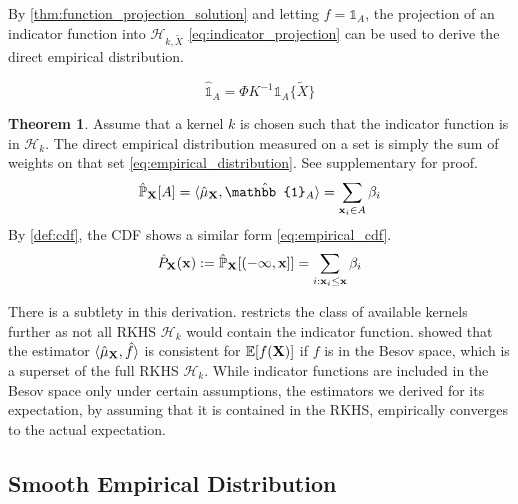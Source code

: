 \documentclass[twoside]{article} \usepackage{aistats2017}
\theoremstyle{definition}
\theoremstyle{theorem}
\newtheorem{theorem}{Theorem}[section]
\newcommand{\rv}[1]{{#1}}
\newcommand{\ds}[1]{\tilde{#1}}
\newcommand{\inner}[2]{{\langle #1, #2 \rangle}}
\begin{document}
		By \cref{thm:function_projection_solution} and letting $f = \mathbb{1}_{A}$,  the projection of an indicator function into $\mathcal{H}_{k, \ds{X}}$ \eqref{eq:indicator_projection} can be used to derive the direct empirical distribution.
			
		\begin{equation}
			\hat{\mathbb{1}}_{A} = \Phi K^{-1} \mathbb{1}_{A}\{\ds{X}\}
		\label{eq:indicator_projection}
		\end{equation}
			
		\begin{theorem} \label{thm:empirical_distribution_and_cdf}
			Assume that a kernel $k$ is chosen such that the indicator function is in $\mathcal{H}_{k}$. The direct empirical distribution measured on a set is simply the sum of weights on that set \eqref{eq:empirical_distribution}. See supplementary for proof.
			\begin{equation}
				\hat{\mathbb{P}}_{\bvec{\rv{X}}}[A] = \inner{\hat{\mu}_{\bvec{\rv{X}}}}{ \hat{\mathbb{1}}_{A}} = \sum_{\bvec{x}_{i} \in A} \beta_{i}
			\label{eq:empirical_distribution}
			\end{equation}
			By \cref{def:cdf}, the CDF shows a similar form \eqref{eq:empirical_cdf}.
			\begin{equation}
				\hat{P}_{\bvec{\rv{X}}}(\bvec{x}) := \hat{\mathbb{P}}_{\bvec{\rv{X}}}[(-\bvec{\infty}, \bvec{x}]] = \sum_{i : \bvec{x}_{i} \leq \bvec{x}} \beta_{i}
			\label{eq:empirical_cdf}
			\end{equation}
		\end{theorem}

		There is a subtlety in this derivation.  restricts the class of available kernels further as not all RKHS $\mathcal{H}_{k}$ would contain the indicator function. \cite{kanagawa2014recovering} showed that the estimator $\langle \hat{\mu}_{\bvec{\rv{X}}}, \hat{f} \rangle$ is consistent for $\mathbb{E}[f(\bvec{\rv{X}})]$ if $f$ is in the Besov space, which is a superset of the full RKHS $\mathcal{H}_{k}$. While indicator functions are included in the Besov space only under certain assumptions, the estimators we derived for its expectation, by assuming that it is contained in the RKHS, empirically converges to the actual expectation.

	\subsection{Smooth Empirical Distribution}
	\label{sec:direct_quantile_regression:smooth_empirical_distribution}
\end{document}
